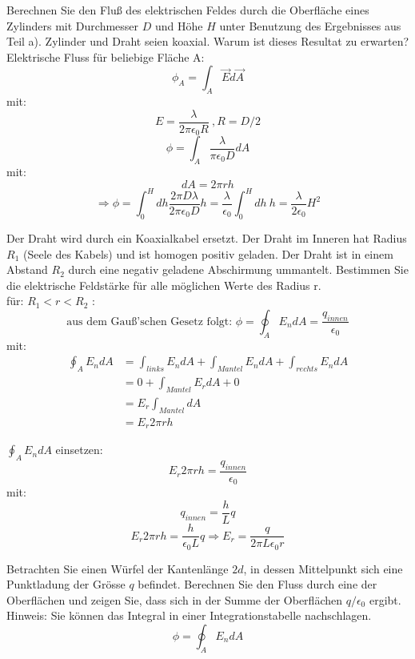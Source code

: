 \documentclass[12pt]{article}
\newenvironment{exercise}[2][Aufgabe]{\begin{trivlist}
\item[\hskip \labelsep {\bfseries #1}\hskip \labelsep {\bfseries #2.}]}{\end{trivlist}}
\begin{document}
\begin{exercise}{1b}
Berechnen Sie den Fluß des elektrischen Feldes durch die Oberfläche eines Zylinders mit Durchmesser $D$ und Höhe $H$ unter Benutzung des Ergebnisses aus Teil a). Zylinder und Draht seien koaxial. Warum ist dieses Resultat zu erwarten?\\[10pt]
	Elektrische Fluss für beliebige Fläche A:
	$$\phi_A = \int_{A}\vec{E}d\vec{A}$$
	mit: $$E = \frac{\lambda}{2 \pi \epsilon_0 R} \ , R = D/2$$
	$$\phi = \int_{A} \frac{\lambda}{\pi \epsilon_0 D}dA$$
	mit: $$dA = 2\pi rh$$
	$$\Rightarrow \phi = \int_{0}^{H}dh \frac{2\pi D \lambda}{2 \pi \epsilon_0 D}h =  \frac{\lambda}{\epsilon_0} \int_{0}^{H}dh\ h =  \frac{\lambda}{2 \epsilon_0}H^2$$
\end{exercise}
\pagebreak

\begin{exercise}{1c}
Der Draht wird durch ein Koaxialkabel ersetzt. Der Draht im Inneren hat Radius $R_1$ (Seele des Kabels) und ist homogen positiv geladen. Der Draht ist in einem Abstand $R_2$ durch eine negativ geladene Abschirmung ummantelt. Bestimmen Sie die elektrische Feldstärke für alle möglichen Werte des Radius r.\\[10pt]
	für: $R_1 < r < R_2$ : $$\textrm{aus dem Gauß'schen Gesetz folgt: } \phi = \oint_A E_ndA = \frac{q_{innen}}{\epsilon_0}$$
	mit: 
	\begin{align*}	
	\oint_A E_n dA &= \int_{links} E_n dA + \int_{Mantel} E_n dA + \int_{rechts} E_n dA\\[10pt] 
	&= 0 + \int_{Mantel} E_r dA + 0\\[10pt] 
	&= E_r \int_{Mantel} dA \\[10pt] 
	&= E_r 2 \pi r h
	\end{align*}
	
	$\oint_A E_n dA$ einsetzen: $$E_r 2 \pi r h = \frac{q_{innen}}{\epsilon_0}$$
	mit: $$q_{innen} = \frac{h}{L}q$$
	$$E_r 2 \pi r h = \frac{h}{\epsilon_0 L}q \Rightarrow E_r = \frac{q}{2 \pi L \epsilon_0 r}$$
	
\end{exercise}
\pagebreak

\begin{exercise}{2}
Betrachten Sie einen Würfel der Kantenlänge $2d$, in dessen Mittelpunkt sich eine Punktladung der Grösse $q$ befindet. Berechnen Sie den Fluss durch eine der Oberflächen und zeigen Sie, dass sich in der Summe der Oberflächen $q/\epsilon_0$ ergibt. Hinweis: Sie können das Integral in einer Integrationstabelle nachschlagen.\\[10pt]
	$$\phi = \oint_A E_n dA$$

\end{exercise}
\pagebreak
\end{document}
